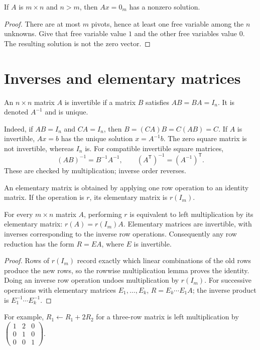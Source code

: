 \begin{theorem}
If $A$ is $m\times n$ and $n>m$, then $Ax=0_m$ has a nonzero solution.
\end{theorem}
\begin{proof}
There are at most $m$ pivots, hence at least one free variable among the
$n$ unknowns. Give that free variable value $1$ and the other free variables
value $0$. The resulting solution is not the zero vector.
\end{proof}

\section{Inverses and elementary matrices}
\begin{definition}[Inverse]
An $n\times n$ matrix $A$ is invertible if a matrix $B$ satisfies
$AB=BA=I_n$. It is denoted $A^{-1}$ and is unique.
\end{definition}
Indeed, if $AB=I_n$ and $CA=I_n$, then
$B=(CA)B=C(AB)=C$. If $A$ is invertible, $Ax=b$ has the unique solution
$x=A^{-1}b$. The zero square matrix is not invertible, whereas $I_n$ is.
For compatible invertible square matrices,
\[
(AB)^{-1}=B^{-1}A^{-1},\qquad
(A^{\mathsf T})^{-1}=(A^{-1})^{\mathsf T}.
\]
These are checked by multiplication; inverse order reverses.

\begin{definition}
An elementary matrix is obtained by applying one row operation to an identity
matrix. If the operation is $r$, its elementary matrix is $r(I_m)$.
\end{definition}
\begin{lemma}
For every $m\times n$ matrix $A$, performing $r$ is equivalent to left
multiplication by its elementary matrix: $r(A)=r(I_m)A$.
Elementary matrices are invertible, with inverses corresponding to the inverse
row operations. Consequently any row reduction has the form $R=EA$, where
$E$ is invertible.
\end{lemma}
\begin{proof}
Rows of $r(I_m)$ record exactly which linear combinations of the old rows
produce the new rows, so the rowwise multiplication lemma proves the identity.
Doing an inverse row operation undoes multiplication by $r(I_m)$.
For successive operations with elementary matrices $E_1,\ldots,E_k$,
$R=E_k\cdots E_1A$; the inverse product is $E_1^{-1}\cdots E_k^{-1}$.
\end{proof}
For example, $R_1\leftarrow R_1+2R_2$ for a three-row matrix is left
multiplication by
$\begin{pmatrix}1&2&0\\0&1&0\\0&0&1\end{pmatrix}$.

